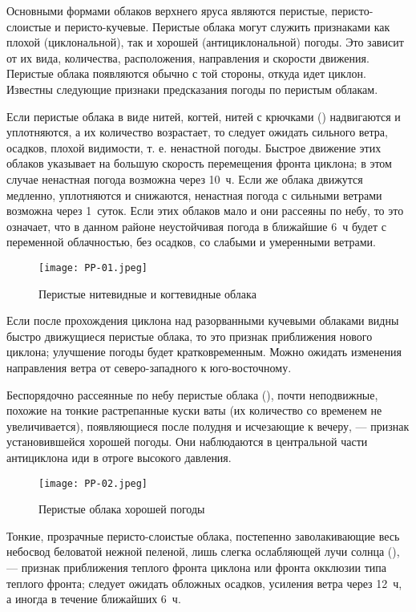Основными формами облаков верхнего яруса являются перистые,
перисто-слоистые и перисто-кучевые. Перистые облака могут служить
признаками как плохой (циклональной), так и хорошей (антициклональной)
погоды. Это зависит от их вида, количества, расположения, направления
и скорости движения. Перистые облака появляются обычно с той стороны,
откуда идет циклон. Известны следующие признаки предсказания погоды по
перистым облакам.

 Если перистые облака в виде нитей, когтей, нитей с крючками
() надвигаются и уплотняются, а их количество возрастает,
то следует ожидать сильного ветра, осадков, плохой видимости,
т. е. ненастной погоды. Быстрое движение этих облаков указывает на
большую скорость перемещения фронта циклона; в этом случае ненастная
погода возможна через 10~ч. Если же облака движутся медленно,
уплотняются и снижаются, ненастная погода с сильными ветрами возможна
через 1~суток. Если этих облаков мало и они рассеяны по небу,
то это означает, что в данном районе неустойчивая погода в ближайшие
6~ч будет с переменной облачностью, без осадков, со слабыми и
умеренными ветрами.

\begin{figure}[htb]
  \centering{}
  \texttt{[image: PP-01.jpeg]}
  \caption{Перистые нитевидные и когтевидные облака}
  \label{fig:pp01}
  \small
  \centering{}
\end{figure}

 Если после прохождения циклона над разорванными кучевыми
облаками видны быстро движущиеся перистые облака, то это признак
приближения нового циклона; улучшение погоды будет
кратковременным. Можно ожидать изменения направления ветра от
северо-западного к юго-восточному.

 Беспорядочно рассеянные по небу перистые облака (),
почти неподвижные, похожие на тонкие растрепанные куски ваты (их
количество со временем не увеличивается), появляющиеся после полудня и
исчезающие к вечеру, --- признак установившейся хорошей погоды. Они
наблюдаются в центральной части антициклона иди в отроге высокого
давления.

\begin{figure}[htb]
  \centering{}
  \texttt{[image: PP-02.jpeg]}
  \caption{Перистые облака хорошей погоды}
  \label{fig:pp02}
  \small
  \centering{}
\end{figure}

 Тонкие, прозрачные перисто-слоистые облака, постепенно
заволакивающие весь небосвод беловатой нежной пеленой, лишь слегка
ослабляющей лучи солнца (), --- признак приближения теплого
фронта циклона или фронта окклюзии типа теплого фронта; следует
ожидать обложных осадков, усиления ветра через 12~ч, а иногда
в течение ближайших 6~ч.

